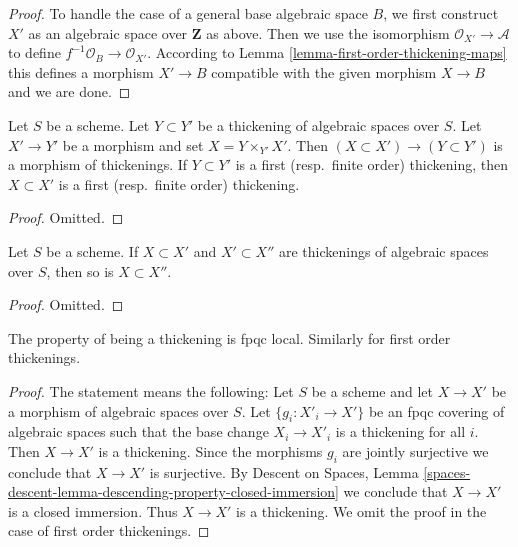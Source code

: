 \begin{proof}
\medskip\noindent
To handle the case of a general base algebraic space $B$, we first
construct $X'$ as an algebraic space over $\mathbf{Z}$ as above.
Then we use the isomorphism $\mathcal{O}_{X'} \to \mathcal{A}$ to
define $f^{-1}\mathcal{O}_B \to \mathcal{O}_{X'}$. According to
Lemma \ref{lemma-first-order-thickening-maps}
this defines a morphism $X' \to B$ compatible with the given morphism
$X \to B$ and we are done.
\end{proof}

\begin{lemma}
\label{lemma-base-change-thickening}
Let $S$ be a scheme. Let $Y \subset Y'$ be a thickening of algebraic spaces
over $S$. Let $X' \to Y'$ be a morphism and set $X = Y \times_{Y'} X'$.
Then $(X \subset X') \to (Y \subset Y')$
is a morphism of thickenings. If $Y \subset Y'$ is a first
(resp.\ finite order) thickening, then $X \subset X'$ is a first
(resp.\ finite order) thickening.
\end{lemma}

\begin{proof}
Omitted.
\end{proof}

\begin{lemma}
\label{lemma-composition-thickening}
Let $S$ be a scheme. If $X \subset X'$ and $X' \subset X''$ are
thickenings of algebraic spaces over $S$, then so is $X \subset X''$.
\end{lemma}

\begin{proof}
Omitted.
\end{proof}

\begin{lemma}
\label{lemma-descending-property-thickening}
The property of being a thickening is fpqc local.
Similarly for first order thickenings.
\end{lemma}

\begin{proof}
The statement means the following: Let $S$ be a scheme and let
$X \to X'$ be a morphism of algebraic spaces over $S$.
Let $\{g_i : X'_i \to X'\}$ be an fpqc covering of algebraic spaces
such that the base change $X_i \to X'_i$ is a thickening for all $i$.
Then $X \to X'$ is a thickening. Since the morphisms $g_i$ are jointly
surjective we conclude that $X \to X'$ is surjective. By
Descent on Spaces, Lemma
\ref{spaces-descent-lemma-descending-property-closed-immersion}
we conclude that $X \to X'$ is a closed immersion.
Thus $X \to X'$ is a thickening. We omit the proof in the
case of first order thickenings.
\end{proof}








